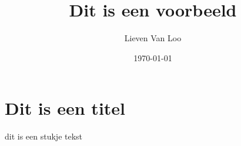 \documentclass[12pt,a4paper]{article}
\author{Lieven Van Loo}
\title{Dit is een voorbeeld}
\date{\today}
\begin{document}
    \maketitle
    
    \section{Dit is een titel}
    dit is een stukje tekst
\end{document}
